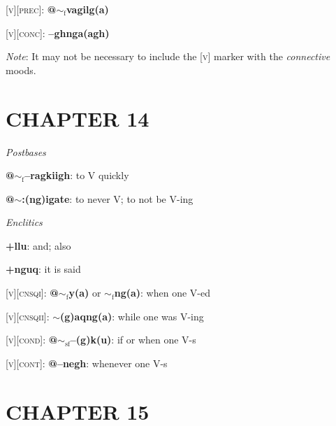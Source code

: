\documentclass{article}
\begin{document}
\bigskip

\textsc{[v][prec]}: \textbf{@$\sim_\text{f}$vagilg(a)}

\bigskip

\textsc{[v][conc]}: \textbf{--ghnga(agh)}

\textit{Note}: It may not be necessary to include the \textsc{[v]} marker with the \textit{connective} moods.


\section{CHAPTER 14}

\textit{Postbases}
\begin{description}
\item \textbf{@$\sim_\text{f}$--ragkiigh}: to V quickly
\item \textbf{@$\sim$:(ng)igate}: to never V; to not be V-ing
\end{description}

\bigskip

\textit{Enclitics}
\begin{description}
\item \textbf{+llu}: and; also
\item \textbf{+nguq}: it is said
\end{description}

\bigskip

\textsc{[v][cnsqi]}: \textbf{@$\sim_\text{f}$y(a)} or \textbf{$\sim_\text{f}$ng(a)}: when one V-ed

\textsc{[v][cnsqii]}: \textbf{$\sim$(g)aqng(a)}: while one was V-ing

\bigskip

\textsc{[v][cond]}: \textbf{@$\sim_\text{sf}$--(g)k(u)}: if or when one V-s

\bigskip

\textsc{[v][cont]}: \textbf{@--negh}: whenever one V-s


\section{CHAPTER 15}
\end{document}
